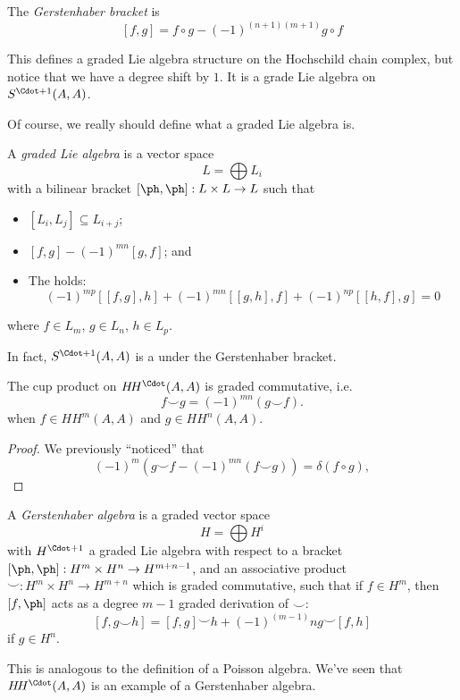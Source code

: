 \documentclass[a4paper]{article}
\newcommand\HH{H\!H}
\begin{document}
\begin{defi}
  The \emph{Gerstenhaber bracket} is
  \[
    [f, g] = f \circ g - (-1)^{(n + 1)(m + 1)} g \circ f
  \]
\end{defi}
This defines a graded Lie algebra structure on the Hochschild chain complex, but notice that we have a degree shift by $1$. It is a grade Lie algebra on $S^{\Cdot + 1}(A, A)$.

Of course, we really should define what a graded Lie algebra is.
\begin{defi}
  A \emph{graded Lie algebra} is a vector space
  \[
    L = \bigoplus L_i
  \]
  with a bilinear bracket $[\ph,\ph] : L \times L \to L$ such that
  \begin{itemize}
    \item $[L_i, L_j] \subseteq L_{i + j}$;
    \item $[f, g] -(-1)^{mn} [g, f]$; and
    \item The  holds:
      \[
        (-1)^{mp} [[f, g], h] + (-1)^{mn} [[g, h], f] + (-1)^{np} [[h, f] ,g] = 0
      \]
  \end{itemize}
  where $f \in L_m$, $g \in L_n$, $h \in L_p$.
\end{defi}

In fact, $S^{\Cdot + 1}(A, A)$ is a  under the Gerstenhaber bracket.

\begin{lemma}
  The cup product on $\HH^\Cdot(A, A)$ is graded commutative, i.e.
  \[
    f \smile g = (-1)^{mn} (g \smile f).
  \]
  when $f \in \HH^m(A, A)$ and $g \in \HH^n(A, A)$.
\end{lemma}

\begin{proof}
  We previously ``noticed'' that
  \[
    (-1)^m(g \smile f - (-1)^{mn} (f \smile g)) = \delta (f \circ g),
  \]
\end{proof}

\begin{defi}
  A \emph{Gerstenhaber algebra} is a graded vector space
  \[
    H = \bigoplus H^i
  \]
  with $H^{\Cdot + 1}$ a graded Lie algebra with respect to a bracket $[\ph, \ph]: H^m \times H^n \to H^{m + n - 1}$, and an associative product $\smile: H^m \times H^n \to H^{m + n}$ which is graded commutative, such that if $f \in H^m$, then $[f, \ph]$ acts as a degree $m - 1$ graded derivation of $\smile$:
  \[
    [f, g \smile h] = [f, g] \smile h + (-1)^{(m - 1)}n g \smile [f, h]
  \]
  if $g \in H^n$.
\end{defi}
This is analogous to the definition of a Poisson algebra. We've seen that $\HH^\Cdot(A, A)$ is an example of a Gerstenhaber algebra.
\end{document}
